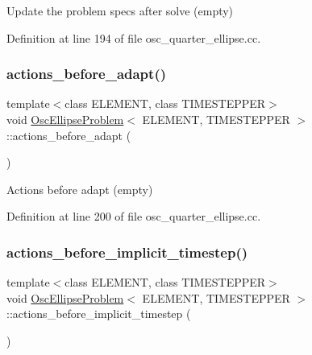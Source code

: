 Update the problem specs after solve (empty) 



Definition at line 194 of file osc\+\_\+quarter\+\_\+ellipse.\+cc.

\mbox{\label{classOscEllipseProblem_a97c1b0056acbb9a6ec6157b6e7ad258a}} 
\subsubsection{\texorpdfstring{actions\+\_\+before\+\_\+adapt()}{actions\_before\_adapt()}}
{\footnotesize\ttfamily template$<$class E\+L\+E\+M\+E\+NT, class T\+I\+M\+E\+S\+T\+E\+P\+P\+ER$>$ \\
void \hyperlink{classOscEllipseProblem}{Osc\+Ellipse\+Problem}$<$ E\+L\+E\+M\+E\+NT, T\+I\+M\+E\+S\+T\+E\+P\+P\+ER $>$\+::actions\+\_\+before\+\_\+adapt (\begin{DoxyParamCaption}{ }\end{DoxyParamCaption})\hspace{0.3cm}{\ttfamily [inline]}}



Actions before adapt (empty) 



Definition at line 200 of file osc\+\_\+quarter\+\_\+ellipse.\+cc.

\mbox{\label{classOscEllipseProblem_a7b12b4fdfcb46c3f00885f0a1f9965b3}} 
\subsubsection{\texorpdfstring{actions\+\_\+before\+\_\+implicit\+\_\+timestep()}{actions\_before\_implicit\_timestep()}}
{\footnotesize\ttfamily template$<$class E\+L\+E\+M\+E\+NT, class T\+I\+M\+E\+S\+T\+E\+P\+P\+ER$>$ \\
void \hyperlink{classOscEllipseProblem}{Osc\+Ellipse\+Problem}$<$ E\+L\+E\+M\+E\+NT, T\+I\+M\+E\+S\+T\+E\+P\+P\+ER $>$\+::actions\+\_\+before\+\_\+implicit\+\_\+timestep (\begin{DoxyParamCaption}{ }\end{DoxyParamCaption})\hspace{0.3cm}{\ttfamily [inline]}}



